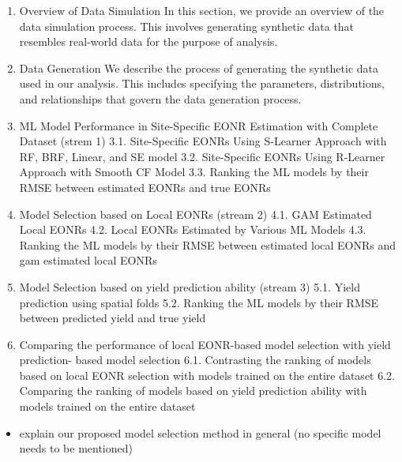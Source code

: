 \documentclass[
  12pt,
]{article}
\providecommand{\tightlist}{%
  \setlength{\itemsep}{0pt}\setlength{\parskip}{0pt}}
\begin{document}
\begin{enumerate}
\def\labelenumi{\arabic{enumi}.}
\tightlist
\item
  Overview of Data Simulation
  In this section, we provide an overview of the data simulation process. This involves generating synthetic data that resembles real-world data for the purpose of analysis.
\item
  Data Generation
  We describe the process of generating the synthetic data used in our analysis. This includes specifying the parameters, distributions, and relationships that govern the data generation process.
\item
  ML Model Performance in Site-Specific EONR Estimation with Complete Dataset (strem 1)
  3.1. Site-Specific EONRs Using S-Learner Approach with RF, BRF, Linear, and SE model
  3.2. Site-Specific EONRs Using R-Learner Approach with Smooth CF Model
  3.3. Ranking the ML models by their RMSE between estimated EONRs and true EONRs
\item
  Model Selection based on Local EONRs (stream 2)
  4.1. GAM Estimated Local EONRs
  4.2. Local EONRs Estimated by Various ML Models
  4.3. Ranking the ML models by their RMSE between estimated local EONRs and gam
  estimated local EONRs
\item
  Model Selection based on yield prediction ability (stream 3)
  5.1. Yield prediction using spatial folds
  5.2. Ranking the ML models by their RMSE between predicted yield and true yield
\item
  Comparing the performance of local EONR-based model selection with yield prediction-
  based model selection
  6.1. Contrasting the ranking of models based on local EONR selection with models
  trained on the entire dataset
  6.2. Comparing the ranking of models based on yield prediction ability with models
  trained on the entire dataset
\end{enumerate}

\begin{itemize}
\tightlist
\item
  explain our proposed model selection method in general (no specific model needs to be mentioned)
\end{itemize}
\end{document}

